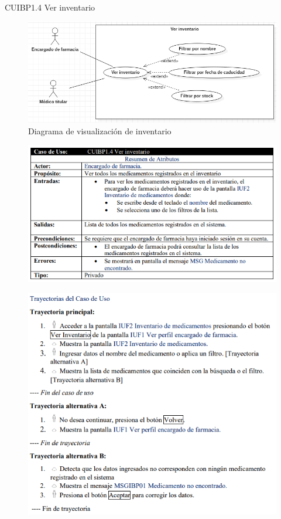 \documentclass[12pt,letterpaper]{article}
\begin{document}
            \newpage
            CUIBP1.4 Ver inventario 
            \begin{figure}[H]
                \centering
                \includegraphics [scale=0.5]{casosUso/verInventario}
                \caption{Diagrama de visualización de inventario}
            \end{figure}
            \begin{figure}[H]
                \centering
                \includegraphics [scale=0.8]{specs/specVerInventario}
            \end{figure}
            \begin{figure}[H]
                \centering
                \includegraphics [scale=0.9]{specs/trayVerInventario}
            \end{figure}
\end{document}
